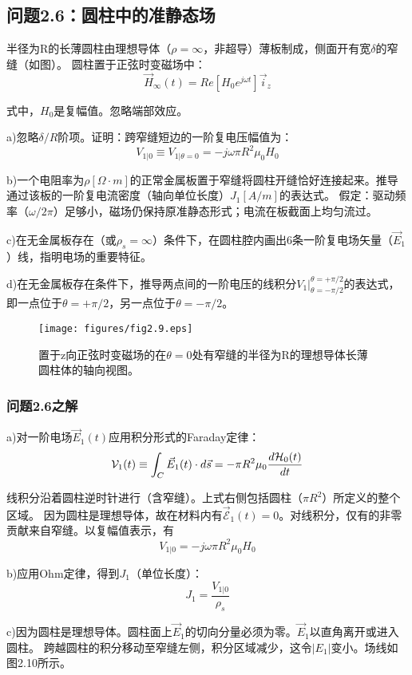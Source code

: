 \subsection{问题2.6：圆柱中的准静态场}
半径为R的长薄圆柱由理想导体（$\rho=\infty$，非超导）薄板制成，侧面开有宽$\delta$的窄缝（如图）。
圆柱置于正弦时变磁场中：
$$\vec{H}_\infty(t)=Re[H_0 e^{j\omega t}] \vec{i}_z$$

式中，$H_0$是复幅值。忽略端部效应。

a)忽略$\delta/R$阶项。证明：跨窄缝短边的一阶复电压幅值为：
$$V_{1|0}\equiv V_{1|\theta=0}=-j\omega \pi R^2 \mu_0 H_0$$

b)一个电阻率为$\rho[\Omega\cdot m]$的正常金属板置于窄缝将圆柱开缝恰好连接起来。推导通过该板的一阶复电流密度（轴向单位长度）$J_1 [A/m]$的表达式。
假定：驱动频率（$\omega/2\pi$）足够小，磁场仍保持原准静态形式；电流在板截面上均匀流过。

c)在无金属板存在（或$\rho_s=\infty$）条件下，在圆柱腔内画出6条一阶复电场矢量（$\vec{E}_1$）线，指明电场的重要特征。

d)在无金属板存在条件下，推导两点间的一阶电压的线积分$V_1 |_{\theta=-\pi/2}^{\theta=+\pi/2}$的表达式，即一点位于$\theta=+\pi/2$，另一点位于$\theta=-\pi/2$。

\begin{figure}
  \centering
 \texttt{[image: figures/fig2.9.eps]}
  \caption{置于z向正弦时变磁场的在$\theta=0$处有窄缝的半径为R的理想导体长薄圆柱体的轴向视图。}
\end{figure}

\subsubsection*{问题2.6之解}
a)对一阶电场$\vec{E}_1(t)$应用积分形式的Faraday定律：
\begin{equation*}
\CMcal{V}_1(t) \equiv \int_{C} \vec{E}_1 (t) \cdot d\vec{s}=-\pi R^2 \mu_0 \frac{d\CMcal{H}_0(t)}{dt}
\end{equation*}


线积分沿着圆柱逆时针进行（含窄缝）。上式右侧包括圆柱（$\pi R^2$）所定义的整个区域。
因为圆柱是理想导体，故在材料内有$\vec{\mathcal{E}}_1(t)=0$。对线积分，仅有的非零贡献来自窄缝。以复幅值表示，有
$$V_{1|0}=-j\omega \pi R^2 \mu_0 H_0$$

b)应用Ohm定律，得到$J_1$（单位长度）：
$$J_1=\frac{V_{1|0}}{\rho_s}$$

c)因为圆柱是理想导体。圆柱面上$\vec{E}_1$的切向分量必须为零。$\vec{E}_1$以直角离开或进入圆柱。
跨越圆柱的积分移动至窄缝左侧，积分区域减少，这令$|E_1|$变小。场线如图2.10所示。

